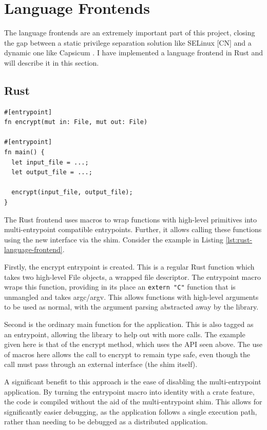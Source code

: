 \documentclass[sigplan]{acmart}
\begin{document}
\section{Language Frontends}

The language frontends are an extremely important part of this project, closing the gap between a static privilege separation solution like SELinux [CN] and a dynamic one like Capsicum \citep{watson_capsicum_2010}. I have implemented a language frontend in Rust and will describe it in this section.

\subsection{Rust}

\begin{lstlisting}[float,label={lst:rust-language-frontend}]
#[entrypoint]
fn encrypt(mut in: File, mut out: File)

#[entrypoint]
fn main() {
  let input_file = ...;
  let output_file = ...;
  
  encrypt(input_file, output_file);
}
\end{lstlisting}

The Rust frontend uses macros to wrap functions with high-level primitives into multi-entrypoint compatible entrypoints. Further, it allows calling these functions using the new interface via the shim. Consider the example in Listing \ref{lst:rust-language-frontend}.

Firstly, the encrypt entrypoint is created. This is a regular Rust function which takes two high-level File objects, a wrapped file descriptor. The entrypoint macro wraps this function, providing in its place an \texttt{extern "C"} function that is unmangled and takes argc/argv. This allows functions with high-level arguments to be used as normal, with the argument parsing abstracted away by the library.

Second is the ordinary main function for the application. This is also tagged as an entrypoint, allowing the library to help out with more calls. The example given here is that of the encrypt method, which uses the API seen above. The use of macros here allows the call to encrypt to remain type safe, even though the call must pass through an external interface (the shim itself).

A significant benefit to this approach is the ease of disabling the multi-entrypoint application. By turning the entrypoint macro into identity with a crate feature, the code is compiled without the aid of the multi-entrypoint shim. This allows for significantly easier debugging, as the application follows a single execution path, rather than needing to be debugged as a distributed application.
\end{document}
